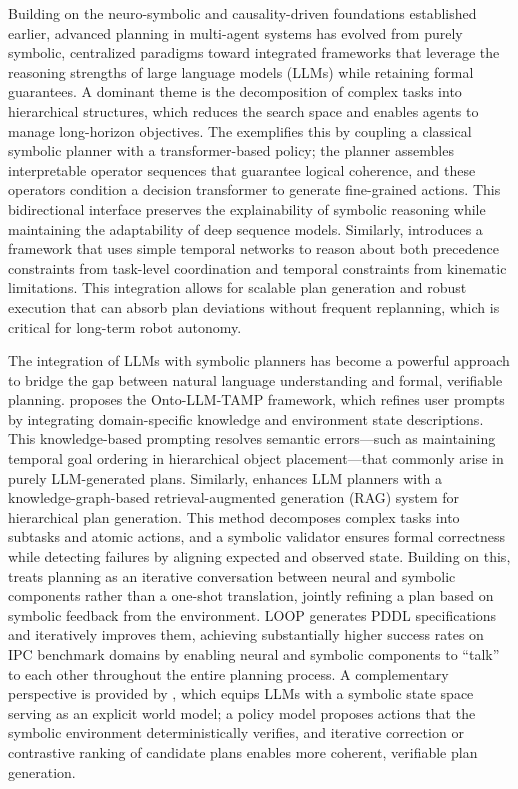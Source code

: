 \documentclass[11pt]{article}
\begin{document}
Building on the neuro-symbolic and causality-driven foundations established earlier, advanced planning in multi-agent systems has evolved from purely symbolic, centralized paradigms toward integrated frameworks that leverage the reasoning strengths of large language models (LLMs) while retaining formal guarantees. A dominant theme is the decomposition of complex tasks into hierarchical structures, which reduces the search space and enables agents to manage long-horizon objectives. The \cite{ref183} exemplifies this by coupling a classical symbolic planner with a transformer-based policy; the planner assembles interpretable operator sequences that guarantee logical coherence, and these operators condition a decision transformer to generate fine-grained actions. This bidirectional interface preserves the explainability of symbolic reasoning while maintaining the adaptability of deep sequence models. Similarly, \cite{ref184} introduces a framework that uses simple temporal networks to reason about both precedence constraints from task-level coordination and temporal constraints from kinematic limitations. This integration allows for scalable plan generation and robust execution that can absorb plan deviations without frequent replanning, which is critical for long-term robot autonomy.

The integration of LLMs with symbolic planners has become a powerful approach to bridge the gap between natural language understanding and formal, verifiable planning. \cite{ref185} proposes the Onto-LLM-TAMP framework, which refines user prompts by integrating domain-specific knowledge and environment state descriptions. This knowledge-based prompting resolves semantic errors---such as maintaining temporal goal ordering in hierarchical object placement---that commonly arise in purely LLM-generated plans. Similarly, \cite{ref186} enhances LLM planners with a knowledge-graph-based retrieval-augmented generation (RAG) system for hierarchical plan generation. This method decomposes complex tasks into subtasks and atomic actions, and a symbolic validator ensures formal correctness while detecting failures by aligning expected and observed state. Building on this, \cite{ref187} treats planning as an iterative conversation between neural and symbolic components rather than a one-shot translation, jointly refining a plan based on symbolic feedback from the environment. LOOP generates PDDL specifications and iteratively improves them, achieving substantially higher success rates on IPC benchmark domains by enabling neural and symbolic components to ``talk'' to each other throughout the entire planning process. A complementary perspective is provided by \cite{ref188}, which equips LLMs with a symbolic state space serving as an explicit world model; a policy model proposes actions that the symbolic environment deterministically verifies, and iterative correction or contrastive ranking of candidate plans enables more coherent, verifiable plan generation.
\end{document}
